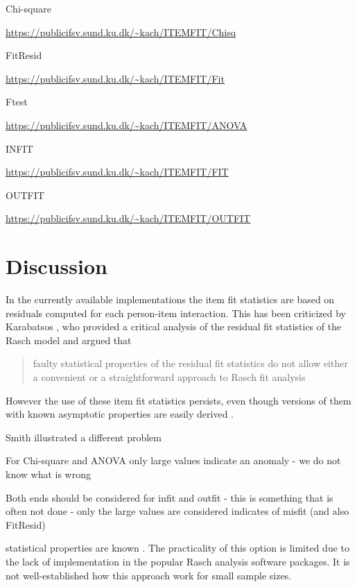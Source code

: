 \documentclass{article}
\begin{document}
Chi-square
\begin{center}
\url{https://publicifsv.sund.ku.dk/~kach/ITEMFIT/Chisq}
\end{center}

FitResid
\begin{center}
\url{https://publicifsv.sund.ku.dk/~kach/ITEMFIT/Fit}
\end{center}

Ftest
\begin{center}
\url{https://publicifsv.sund.ku.dk/~kach/ITEMFIT/ANOVA}
\end{center}

INFIT
\begin{center}
\url{https://publicifsv.sund.ku.dk/~kach/ITEMFIT/FIT}
\end{center}

OUTFIT
\begin{center}
\url{https://publicifsv.sund.ku.dk/~kach/ITEMFIT/OUTFIT}
\end{center}

\section{Discussion}


In the currently available implementations the item fit statistics are based on residuals computed for each person-item interaction. This has been criticized by Karabatsos \cite{Karabatsos2000a}, who provided a critical analysis of the residual fit statistics of the Rasch model and argued that

\begin{quote}
faulty statistical properties of the residual fit statistics do not allow either a convenient or a straightforward approach to Rasch fit analysis
\end{quote}

However the use of these item fit statistics persists, even though versions of them with known asymptotic properties are easily derived \cite{Christensen-Kreiner2013}.

Smith illustrated a different problem \cite{smith2008}

For Chi-square and ANOVA only large values indicate an anomaly - we do not know what is wrong

Both ends should be considered for infit and outfit - this is something that is often not done - only the large values are considered indicates of misfit (and also FitResid)

statistical properties are known \cite{Christensen-Kreiner2013}. The practicality of this option is limited due to the lack of implementation in the popular Rasch analysis software packages. It is not well-established how this approach work for small sample sizes.
\end{document}
